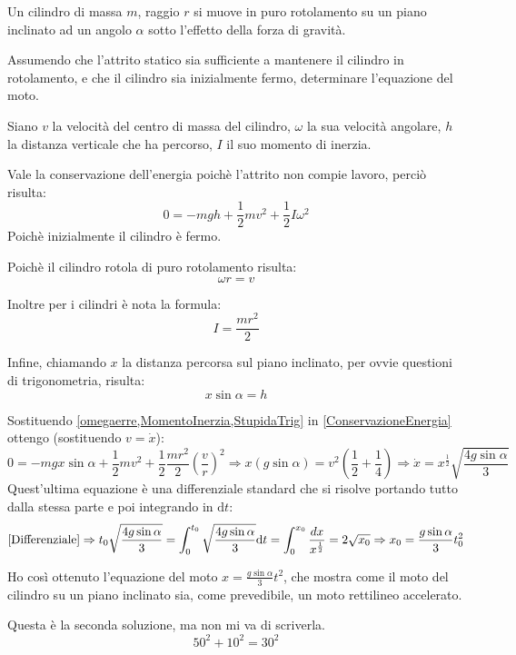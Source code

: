 \documentclass[../main.tex]{subfiles}
\begin{document}
\textex
Un cilindro di massa $m$, raggio $r$ si muove in puro rotolamento su un piano inclinato
ad un angolo $\alpha$ sotto l'effetto della forza di gravità.

Assumendo che l'attrito statico sia sufficiente a mantenere il cilindro in rotolamento, e che il cilindro sia inizialmente
fermo, determinare l'equazione del moto.

\solution
Siano $v$ la velocità del centro di massa del cilindro, $\omega$ la sua velocità angolare,
$h$ la distanza verticale che ha percorso, $I$ il suo momento di inerzia.

Vale la conservazione dell'energia poichè l'attrito non compie lavoro, perciò risulta:
\begin{equation}\label{ConservazioneEnergia}
	0=-mgh+\frac12mv^2+\frac12 I \omega^2
\end{equation}
Poichè inizialmente il cilindro è fermo.

Poichè il cilindro rotola di puro rotolamento risulta:
\begin{equation}\label{omegaerre}
	\omega r=v
\end{equation}

Inoltre per i cilindri è nota la formula:
\begin{equation}\label{MomentoInerzia}
	I=\frac{mr^2}2
\end{equation}

Infine, chiamando $x$ la distanza percorsa sul piano inclinato, per ovvie questioni di trigonometria, risulta:
\begin{equation}\label{StupidaTrig}
	x\sin{\alpha}=h
\end{equation}

Sostituendo \cref{omegaerre,MomentoInerzia,StupidaTrig} in \cref{ConservazioneEnergia} ottengo (sostituendo $v=\dot x$):
\begin{equation}\label{Differenziale}
	0=-mgx\sin{\alpha}+\frac12mv^2+\frac12 \frac{mr^2}2\left(\frac vr\right)^2 \Rightarrow x\left(g\sin{\alpha}\right)=v^2\left(\frac12+\frac14\right)
	\Rightarrow \dot{x}=x^{\frac12}\sqrt{\frac{4g\sin{\alpha}}3}
\end{equation}
Quest'ultima equazione è una differenziale standard che si risolve portando tutto dalla stessa parte e poi integrando in 
$\mathrm{d}t$:
\begin{equation*}
	\cref{Differenziale}\Rightarrow t_0\sqrt{\frac{4g\sin{\alpha}}3}=\int_0^{t_0}\sqrt{\frac{4g\sin{\alpha}}3}\mathrm{d}t=
	\int_0^{x_0} \frac{dx}{ x^{\frac12} }=2\sqrt{x_0}\Rightarrow x_0=\frac{g\sin{\alpha}}3t_0^2
\end{equation*}

Ho così ottenuto l'equazione del moto $x=\frac{g\sin{\alpha}}3t^2$, che mostra come il moto del cilindro su un 
piano inclinato sia, come prevedibile, un moto rettilineo accelerato.

\solution[2]
Questa è la seconda soluzione, ma non mi va di scriverla.
\begin{equation}\label{Marameo}
	50^2+10^2=30^2
\end{equation}
\end{document}
